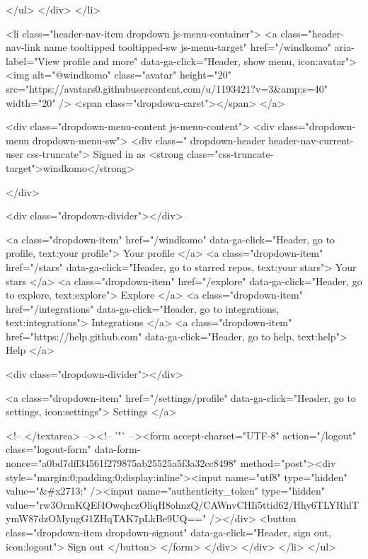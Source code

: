       </ul>
    </div>
  </li>

  <li class="header-nav-item dropdown js-menu-container">
    <a class="header-nav-link name tooltipped tooltipped-sw js-menu-target" href="/windkomo"
       aria-label="View profile and more"
       data-ga-click="Header, show menu, icon:avatar">
      <img alt="@windkomo" class="avatar" height="20" src="https://avatars0.githubusercontent.com/u/1193421?v=3&amp;s=40" width="20" />
      <span class="dropdown-caret"></span>
    </a>

    <div class="dropdown-menu-content js-menu-content">
      <div class="dropdown-menu  dropdown-menu-sw">
        <div class=" dropdown-header header-nav-current-user css-truncate">
            Signed in as <strong class="css-truncate-target">windkomo</strong>

        </div>


        <div class="dropdown-divider"></div>

          <a class="dropdown-item" href="/windkomo" data-ga-click="Header, go to profile, text:your profile">
            Your profile
          </a>
        <a class="dropdown-item" href="/stars" data-ga-click="Header, go to starred repos, text:your stars">
          Your stars
        </a>
        <a class="dropdown-item" href="/explore" data-ga-click="Header, go to explore, text:explore">
          Explore
        </a>
          <a class="dropdown-item" href="/integrations" data-ga-click="Header, go to integrations, text:integrations">
            Integrations
          </a>
        <a class="dropdown-item" href="https://help.github.com" data-ga-click="Header, go to help, text:help">
          Help
        </a>

          <div class="dropdown-divider"></div>

          <a class="dropdown-item" href="/settings/profile" data-ga-click="Header, go to settings, icon:settings">
            Settings
          </a>

          <!-- </textarea> --><!-- '"` --><form accept-charset="UTF-8" action="/logout" class="logout-form" data-form-nonce="a0bd7dff34561f279875ab25525a5f3a32cc8498" method="post"><div style="margin:0;padding:0;display:inline"><input name="utf8" type="hidden" value="&#x2713;" /><input name="authenticity_token" type="hidden" value="rw3OrmKQEf4OwqhczOliqH8ohnzQ/CAWnvCHIi5ttid62/Hhy6TLYRhlTymW87dzOMyngG1ZHqTAK7pLkBe9UQ==" /></div>
            <button class="dropdown-item dropdown-signout" data-ga-click="Header, sign out, icon:logout">
              Sign out
            </button>
</form>
      </div>
    </div>
  </li>
</ul>


